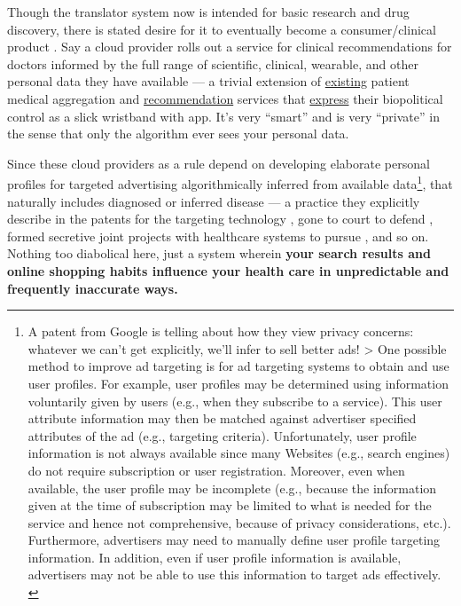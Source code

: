\documentclass[11pt]{article}
\begin{document}
\begin{multicols}{2}
Though the translator system now is intended for basic research and drug
discovery, there is stated desire for it to eventually become a
consumer/clinical product \cite{hailuNIHfundedProjectAims2019} .
Say a cloud provider rolls out a service for clinical recommendations
for doctors informed by the full range of scientific, clinical,
wearable, and other personal data they have available --- a trivial
extension of
\href{https://web.archive.org/web/20211003070018/https://support.apple.com/en-us/HT208680}{existing}
patient medical aggregation and
\href{https://web.archive.org/web/20210408221213/https://support.google.com/fit/answer/7619539?hl=en\&co=GENIE.Platform\%3DAndroid}{recommendation}
services that
\href{https://web.archive.org/web/20210930203834/https://press.aboutamazon.com/news-releases/news-release-details/amazon-adds-more-halo-introducing-halo-view-halo-fitness-and}{express}
their biopolitical control as a slick wristband with app. It's very
``smart'' and is very ``private'' in the sense that only the algorithm
ever sees your personal data.

Since these cloud providers as a rule depend on developing elaborate
personal profiles for targeted advertising algorithmically inferred from
available data\footnote{A patent from Google is telling about how they
  view privacy concerns: whatever we can't get explicitly, we'll infer
  to sell better ads! \textgreater{} One possible method to improve ad
  targeting is for ad targeting systems to obtain and use user profiles.
  For example, user profiles may be determined using information
  voluntarily given by users (e.g., when they subscribe to a service).
  This user attribute information may then be matched against advertiser
  specified attributes of the ad (e.g., targeting criteria).
  Unfortunately, user profile information is not always available since
  many Websites (e.g., search engines) do not require subscription or
  user registration. Moreover, even when available, the user profile may
  be incomplete (e.g., because the information given at the time of
  subscription may be limited to what is needed for the service and
  hence not comprehensive, because of privacy considerations, etc.).
  Furthermore, advertisers may need to manually define user profile
  targeting information. In addition, even if user profile information
  is available, advertisers may not be able to use this information to
  target ads effectively. \cite{bharatGeneratingUserInformation2005} }, that naturally includes diagnosed or inferred disease --- a
practice they explicitly describe in the patents for the targeting
technology\cite{bharatGeneratingUserInformation2005} , gone to
court to defend \cite{SmithFacebookInc2018
krashinskyGoogleBrokeCanada2014} , formed secretive joint projects
with healthcare systems to pursue \cite{bourreauGoogleFitbitWill2020} , and so on. Nothing too diabolical here, just a system wherein
\textbf{your search results and online shopping habits influence your
health care in unpredictable and frequently inaccurate \cite{rasmyMedBERTPretrainedContextualized2021}  ways.}


\end{multicols}
\end{document}
